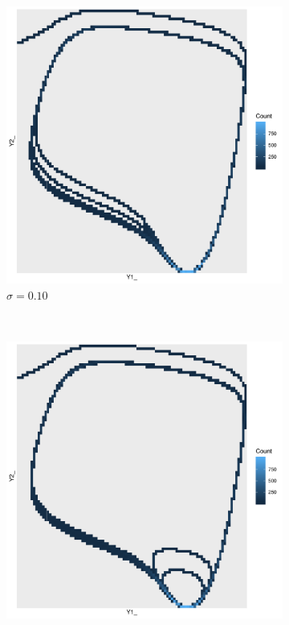 \documentclass[a4paper]{article}
\begin{document}
\begin{figure}[ht!]
    \centering
    \begin{subfigure}[b]{0.45\textwidth}
        \includegraphics[width=\textwidth]{part1b-sigma1-grid.pdf}
        \caption{$\sigma = 0.10$}
    \end{subfigure}
    ~
    \begin{subfigure}[b]{0.45\textwidth}
        \includegraphics[width=\textwidth]{part1b-sigma2-grid.pdf}

\end{subfigure}
\end{figure}
\end{document}
